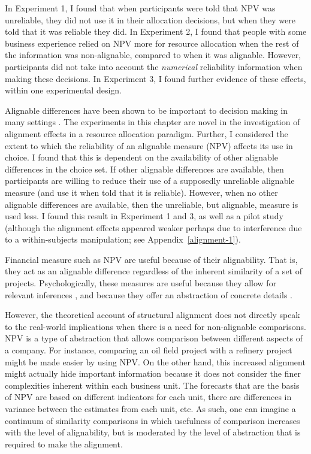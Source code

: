 \documentclass[a4paper, nobind, dvipsnames]{templates/ociamthesis}
\theoremstyle{definition}
\theoremstyle{definition}
\theoremstyle{definition}
\theoremstyle{definition}
\theoremstyle{remark}
\begin{document}
In Experiment 1, I found that when participants were told that NPV was
unreliable, they did not use it in their allocation decisions, but when they
were told that it was reliable they did. In Experiment 2, I found that people
with some business experience relied on NPV more for resource allocation when
the rest of the information was non-alignable, compared to when it was
alignable. However, participants did not take into account the \emph{numerical}
reliability information when making these decisions. In Experiment 3, I found
further evidence of these effects, within one experimental design.

Alignable differences have been shown to be important to decision making in many
settings \autocite{markman2010,markman1995}. The experiments in this chapter are novel
in the investigation of alignment effects in a resource allocation paradigm.
Further, I considered the extent to which the reliability of an alignable
measure (NPV) affects its use in choice. I found that this is dependent on the
availability of other alignable differences in the choice set. If other
alignable differences are available, then participants are willing to reduce
their use of a supposedly unreliable alignable measure (and use it when told
that it is reliable). However, when no other alignable differences are
available, then the unreliable, but alignable, measure is used less. I found
this result in Experiment 1 and 3, as well as a pilot study (although the
alignment effects appeared weaker perhaps due to interference due to a
within-subjects manipulation; see Appendix~\ref{alignment-1}).

Financial measure such as NPV are useful because of their alignability. That is,
they act as an alignable difference regardless of the inherent similarity of a
set of projects. Psychologically, these measures are useful because they allow
for relevant inferences \autocite{lassaline1996}, and because they offer an abstraction
of concrete details \autocite{doumas2013}.

However, the theoretical account of structural alignment does not directly speak
to the real-world implications when there is a need for non-alignable
comparisons. NPV is a type of abstraction that allows comparison between
different aspects of a company. For instance, comparing an oil field project
with a refinery project might be made easier by using NPV. On the other hand,
this increased alignment might actually hide important information because it
does not consider the finer complexities inherent within each business unit. The
forecasts that are the basis of NPV are based on different indicators for each
unit, there are differences in variance between the estimates from each unit,
etc. As such, one can imagine a continuum of similarity comparisons in which
usefulness of comparison increases with the level of alignability, but is
moderated by the level of abstraction that is required to make the alignment.
\end{document}
